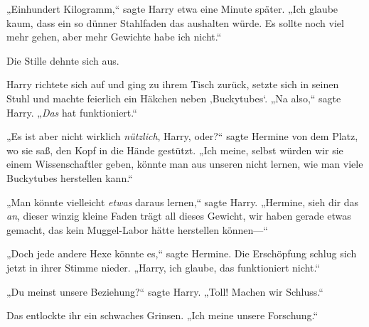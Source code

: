 „Einhundert Kilogramm,“ sagte Harry etwa eine Minute später. „Ich glaube kaum, dass ein so dünner Stahlfaden das aushalten würde. Es sollte noch viel mehr gehen, aber mehr Gewichte habe ich nicht.“

Die Stille dehnte sich aus.

Harry richtete sich auf und ging zu ihrem Tisch zurück, setzte sich in seinen Stuhl und machte feierlich ein Häkchen neben ‚Buckytubes‘. „Na also,“ sagte Harry. „\emph{Das} hat funktioniert.“

„Es ist aber nicht wirklich \emph{nützlich}, Harry, oder?“ sagte Hermine von dem Platz, wo sie saß, den Kopf in die Hände gestützt. „Ich meine, selbst würden wir sie einem Wissenschaftler geben, könnte man aus unseren nicht lernen, wie man viele Buckytubes herstellen kann.“

„Man könnte vielleicht \emph{etwas} daraus lernen,“ sagte Harry. „Hermine, sieh dir das \emph{an}, dieser winzig kleine Faden trägt all dieses Gewicht, wir haben gerade etwas gemacht, das kein Muggel-Labor hätte herstellen können—“

„Doch jede andere Hexe könnte es,“ sagte Hermine. Die Erschöpfung schlug sich jetzt in ihrer Stimme nieder. „Harry, ich glaube, das funktioniert nicht.“

„Du meinst unsere Beziehung?“ sagte Harry. „Toll! Machen wir Schluss.“

Das entlockte ihr ein schwaches Grinsen. „Ich meine unsere Forschung.“

